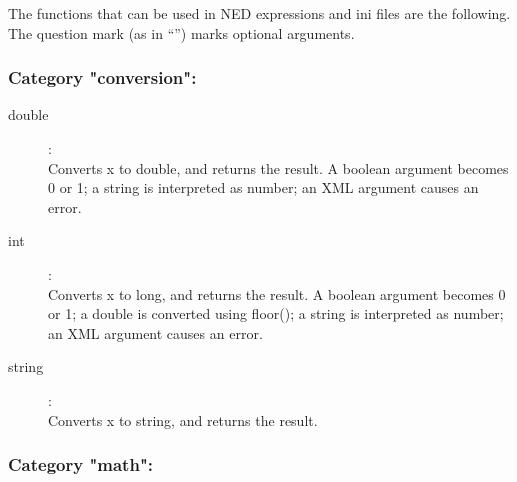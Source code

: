 \label{cha:ned-functions}

The functions that can be used in NED expressions and ini files are the
following. The question mark (as in ``'') marks optional arguments.

%
%

\subsubsection{Category "conversion":}

\begin{description}
\item[double]:  \\
    Converts x to double, and returns the result. A boolean argument becomes 0 or 1; a string is interpreted as number; an XML argument causes an error.
\item[int]:  \\
    Converts x to long, and returns the result. A boolean argument becomes 0 or 1; a double is converted using floor(); a string is interpreted as number; an XML argument causes an error.
\item[string]:  \\
    Converts x to string, and returns the result.

\end{description}

\subsubsection{Category "math":}

